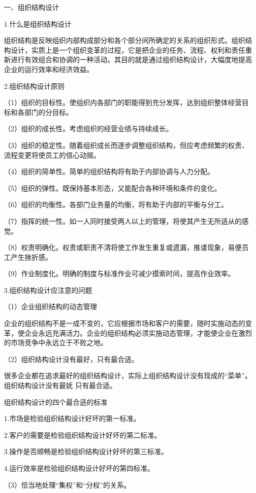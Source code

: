\documentclass[CJK]{z-article}
\begin{document}
    一、组织结构设计

    1.什么是组织结构设计

    组织结构是反映组织内部构成部分和各个部分间所确定的关系的组织形式。组织结构设计，实质上是一个组织变革的过程，它是把企业的任务、流程、权利和责任重新进行有效组合和协调的一种活动。其目的就是通过组织结构设计，大幅度地提高企业的运行效率和经济效益。

    2.组织结构设计原则

    （1）组织的目标性。使组织内各部门的职能得到充分发挥，达到组织整体经营目标和各部门的分目标。

    （2）组织的成长性。考虑组织的经营业绩与持续成长。

    （3）组织的稳定性。随着组织成长而逐步调整组织结构，但应考虑频繁的权责、流程变更将使员工的信心动摇。

    （4）组织的简单性。简单的组织结构将有助于内部协调与人力分配。

    （5）组织的弹性。既保持基本形态，又能配合各种环境和条件的变化。

    （6）组织的均衡性。各部门业务量的均衡，将有助于内部的平衡与分工。

    （7）指挥的统一性。如一人同时接受两人以上的管理，将使其产生无所适从的感觉。

    （8）权责明确化。权责或职责不清将使工作发生重复或遗漏，推诿现象，易便员工产生挫折感。

    （9）作业制度化。明确的制度与标准作业可减少摸索时间，提高作业效率。

    3.组织结构设计应注意的问题

    （1）企业组织结构的动态管理

    企业的组织结构不是一成不变的，它应根据市场和客户的需要，随时实施动态的变革，使企业永远充满活力。企业的组织结构必须实施动态管理，才能使企业在激烈的市场竞争中永远立于不败之地。

  （2）组织结构设计没有最好，只有最合适。

    很多企业都在追求最好的组织结构设计，实际上组织结构设计没有现成的“菜单”。组织结构设计没有最妩 只有最合适。

    组织结构设计的四个最合适的标准

    1.市场是检验组织结构设计好坏的第一标准。

    2.客户的需要是检验组织结构设计好坏的第二标准。

    3.操作是否顺畅是检验组织结构设计好坏的第三标准。

    4.运行效率是检验组织结构设计好坏的第四标准。

  （3）恰当地处理“集权”和“分权”的关系。
\end{document}
